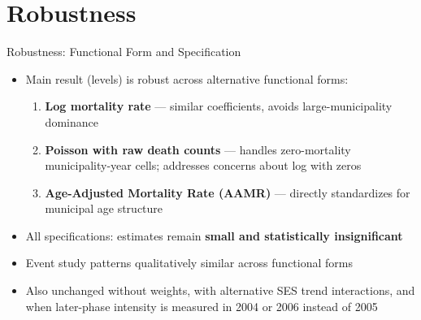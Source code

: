 \documentclass[aspectratio=169,usenames,dvipsnames]{beamer}
\newcommand{\smallcite}[1]{{\footnotesize\textcolor{Blue}{\citep{#1}}}}
\begin{document}
\section{Robustness}

\begin{frame}{Robustness: Functional Form and Specification}\label{robustness_ff}
\small
\begin{itemize}
  \item[$\circ$] Main result (levels) is robust across alternative functional forms:
    \vspace{4pt}
    \begin{enumerate}
      \item \textbf{Log mortality rate} --- similar coefficients, avoids large-municipality dominance
      \vspace{4pt}
      \item \textbf{Poisson with raw death counts} --- handles zero-mortality municipality-year cells; addresses \smallcite{ChenRoth2024QJE} concerns about log with zeros
      \vspace{4pt}
      \item \textbf{Age-Adjusted Mortality Rate (AAMR)} --- directly standardizes for municipal age structure
    \end{enumerate}
  \vspace{8pt}
  \item[$\circ$] All specifications: estimates remain \textbf{small and statistically insignificant}
  \vspace{8pt}
  \item[$\circ$] Event study patterns qualitatively similar across functional forms
  \vspace{8pt}
  \item[$\circ$] Also unchanged without weights, with alternative SES trend interactions, and when later-phase intensity is measured in 2004 or 2006 instead of 2005
\end{itemize}
\end{frame}

\end{document}
